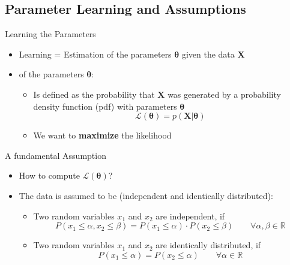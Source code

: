 \subsection{Parameter Learning and Assumptions}

\begin{frame}{Learning the Parameters}{}
	\begin{itemize}
		\item Learning = Estimation of the parameters $\bm{\theta}$ given the data $\bm{X}$
		\item {} of the parameters $\bm{\theta}$:
		\begin{itemize}
			\item Is defined as the probability that $\bm{X}$ was generated by a
				probability density function (pdf) with parameters $\bm{\theta}$
			\begin{equation}
				\mathcal{L}(\bm{\theta}) = p(\bm{X} \vert \bm{\theta})
			\end{equation}
			\item We want to \textbf{maximize} the likelihood
		\end{itemize}
	\end{itemize}
	
	\begin{boxBlueNoFrame}
	\end{boxBlueNoFrame}
\end{frame}


\begin{frame}{A fundamental Assumption}{}
	\begin{itemize}
		\item How to compute $\mathcal{L}(\bm{\theta})$?
		\item The data is assumed to be  (independent and identically distributed):
		\begin{itemize}
			\item Two random variables $x_1$ and $x_2$ are independent, if
			\begin{equation}
				P(x_1 \le \alpha, x_2 \le \beta) = P(x_1 \le \alpha) \cdot P(x_2 \le \beta) \qquad \forall \alpha, \beta \in \mathbb{R}
			\end{equation}
			\item Two random variables $x_1$ and $x_2$ are identically distributed, if
			\begin{equation}
				P(x_1 \le \alpha) = P(x_2 \le \alpha) \qquad \forall \alpha \in \mathbb{R}
			\end{equation}
		\end{itemize}
	\end{itemize}
\end{frame}


